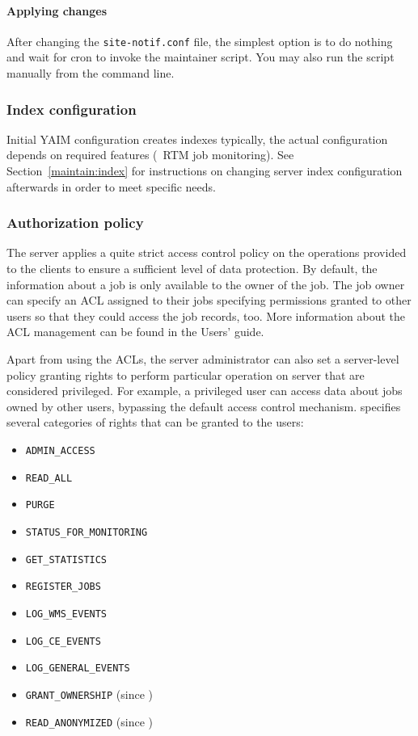 \paragraph{Applying changes} After changing the \texttt{site-notif.conf} file, the simplest option is to do nothing and wait for cron to invoke the maintainer script. You may also run the script manually from the command line.

\subsubsection{Index configuration}

Initial YAIM configuration creates \LB indexes typically,
the actual configuration depends on required features (\eg\ RTM job monitoring).
See Section~\ref{maintain:index} for instructions
on changing \LB server index configuration afterwards in order
to meet specific needs.

\subsubsection{Authorization policy}
\label{inst:authz}
The \LB server applies a quite strict access control policy on the
operations provided to the clients to ensure a sufficient level of data
protection. By default, the information about a job is only available to the
owner of the job. The job owner can specify an ACL assigned to their jobs
specifying permissions granted to other users so that they could access the
job records, too. More information about the ACL management can be found in
the \LB Users' guide.

Apart from using the ACLs, the \LB server administrator can also set a
server-level policy granting rights to perform particular operation on \LB
server that are considered privileged.
For example, a privileged
user can access data about jobs owned by other users, bypassing the default
\LB access control mechanism.  specifies several categories of
rights that can be granted to the users:

\begin{itemize}
\item \verb'ADMIN_ACCESS'
\item \verb'READ_ALL'
\item \verb'PURGE'
\item \verb'STATUS_FOR_MONITORING'
\item \verb'GET_STATISTICS'
\item \verb'REGISTER_JOBS'
\item \verb'LOG_WMS_EVENTS'
\item \verb'LOG_CE_EVENTS'
\item \verb'LOG_GENERAL_EVENTS'
\item \verb'GRANT_OWNERSHIP' (since )
\item \verb'READ_ANONYMIZED' (since )
\end{itemize}

